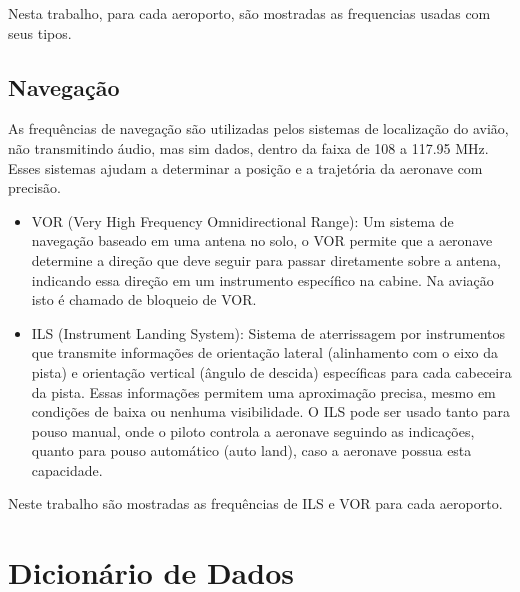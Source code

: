 Nesta trabalho, para cada aeroporto, são mostradas as frequencias usadas com seus
tipos.

\subsection{Navegação}

As frequências de navegação são utilizadas pelos sistemas de localização do avião, 
não transmitindo áudio, mas sim dados, dentro da faixa de 108 a 117.95 MHz. Esses 
sistemas ajudam a determinar a posição e a trajetória da aeronave com precisão.

\begin{itemize} 
\item VOR (Very High Frequency Omnidirectional Range): Um sistema 
de navegação baseado em uma antena no solo, o VOR permite que a aeronave 
determine a direção que deve seguir para passar diretamente sobre a antena, 
indicando essa direção em um instrumento específico na cabine. Na aviação isto
é chamado de bloqueio de VOR. \cite{vor-block}

\item ILS (Instrument Landing System): Sistema de aterrissagem por instrumentos 
que transmite informações de orientação lateral (alinhamento com o eixo da pista) 
e orientação vertical (ângulo de descida) específicas para cada cabeceira da pista. 
Essas informações permitem uma aproximação precisa, mesmo em condições de baixa 
ou nenhuma
visibilidade. O ILS pode ser usado tanto para pouso manual, onde o piloto controla
a aeronave seguindo 
as indicações, quanto para pouso automático (auto land), caso a aeronave possua 
esta capacidade. \cite{ils-train}
\end{itemize}

Neste trabalho são mostradas as frequências de ILS e VOR para cada aeroporto.

\section{Dicionário de Dados}

